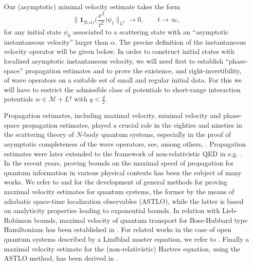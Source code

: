 \documentclass[12pt]{article}
\theoremstyle{plain}
\newcommand{\meas}{\mathcal{M}}
\begin{document}
Our (asymptotic) minimal velocity estimate takes the form
 \begin{equation}\label{eq:min-vel-intro}
\Big\| \mathbf{1}_{[0,\alpha)}\Big(\frac{x^2}{t^2}\Big) \psi_t\Big\|_{L^2} \to 0, \qquad t\to\infty,
\end{equation}
for any initial state $\psi_0$ associated to a scattering state with an ``asymptotic instantaneous velocity'' larger than $\alpha$. The precise definition of the instantaneous velocity operator will be given below. In order to construct initial states with localized asymptotic instantaneous velocity, we will need first to establish ``phase-space'' propagation estimates and to prove the existence, and right-invertibility, of wave operators on a suitable set of small and regular initial data. For this we will have to restrict the admissible class of potentials to short-range interaction potentials $w\in \meas +L^q$ with $q<\frac{d}{2}$.

Propagation estimates, including maximal velocity, minimal velocity and phase-space propagation estimates, played a crucial role in the eighties and nineties in the scattering theory of $N$-body quantum systems, especially in the proof of asymptotic completeness of the wave operators, see, among others, \cites{Enss83,SigalSoffer88,SigalSoffer90,Gerard92,Derezinski93,Skibsted91,Graf90,HunzikerSigalSoffer99}. Propagation estimates were later extended to the framework of non-relativistic QED in e.g. \cites{DerezinskiGerard99,FrohlichGriesemerSchlein02,BonyFaupinSigal12,FaupinSigal14}. In the recent years, proving bounds on the maximal speed of propagation for quantum information in various physical contexts has been the subject of many works. We refer to \cite{ArbunichPusateriSigalSoffer21} and \cite{SigalWu} for the development of general methods for proving maximal velocity estimates for quantum systems, the former by the means of adiabatic space-time localization observables (ASTLO), while the latter is based on analyticity properties leading to exponential bounds.
In relation with Lieb-Robinson bounds, maximal velocity of quantum transport for Bose-Hubbard type Hamiltonians has been established in \cites{FaupinLemmSigal22_LR, FaupinLemmSigal22_maxv,LemmRubilianiZhang23,FaupinLemmSigalZhang25, LemmRubilianiZhang25}. For related works in the case of open quantum systems described by a Lindblad master equation, we refer to \cites{BreteauxFaupinLemmSigal22,BreteauxFaupinLemmSigalYangZhang24,SigalWu25}. Finally a maximal velocity estimate for the (non-relativistic) Hartree equation, using the ASTLO method, has been derived in \cite{ArbunichFaupinPusateriSigal23}.
\end{document}
